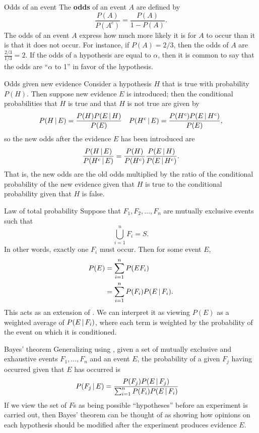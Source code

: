 \begin{bdef}{Odds of an event}\label{odds}
    The \textbf{odds} of an event $A$ are defined by \[
        \frac{P(A)}{P(A^c)} = \frac{P(A)}{1 - P(A)}.
    \] The odds of an event $A$ express how much more likely it is for $A$ to occur than it is that it does not occur. For instance, if $P(A) = 2/3$, then the odds of $A$ are $\frac{2/3}{1/3} = 2$. If the odds of a hypothesis are equal to $\alpha$, then it is common to say that the odds are ``$\alpha$ to 1'' in favor of the hypothesis.
\end{bdef}
\begin{bdef}{Odds given new evidence}\label{odds2}
    Consider a hypothesis $H$ that is true with probability $P(H)$. Then suppose new evidence $E$ is introduced; then the conditional probabilities that $H$ is true and that $H$ is not true are given by \[
        \begin{aligned}
            P(H \,\vert\, E) = \frac{P(H)P(E \,\vert\, H)}{P(E)} && P(H^c \,\vert\, E) = \frac{P(H^c)P(E \,\vert\, H^c)}{P(E)}
        \end{aligned},
    \] so the new odds after the evidence $E$ has been introduced are 
    \[
            \frac{P(H \,\vert\, E)}{P(H^c \,\vert\, E)} = \frac{P(H)}{P(H^c)}\frac{P(E \,\vert\, H)}{P(E \,\vert\, H^c)}. 
    \]
    That is, the new odds are the old odds multiplied by the ratio of the conditional probability of the new evidence given that $H$ is true to the conditional probability given that $H$ is false.
\end{bdef}
\begin{bdef}{Law of total probability}\label{totalprob}
    Suppose that $F_1, F_2, \dots, F_n$ are mutually exclusive events such that \[
        \bigcup^n_{i=1} F_i = S.    
    \] In other words, exactly one $F_i$ must occur. Then for some event $E$, \[
        \begin{aligned}
            P(E) &= \sum^n_{i=1} P(EF_i) \\
            &= \sum^n_{i=1} P(F_i)P(E \,\vert\, F_i).
        \end{aligned}    
    \] This acts as an extension of . We can interpret it as viewing $P(E)$ as a weighted average of $P(E \,\vert\, F_i)$, where each term is weighted by the probability of the event on which it is conditioned.
\end{bdef}
\begin{bdef}{Bayes' theorem}\label{genbayes}
    Generalizing  using , given a set of mutually exclusive and exhaustive events $F_1, \dots, F_n$ and an event $E$, the probability of a given $F_j$ having occurred given that $E$ has occurred is \[
        \begin{aligned}
            P(F_j \,\vert\, E) &= \frac{P(F_j)P(E \,\vert\, F_j)}{\sum^n_{i=1}P(F_i)P(E \,\vert\, F_i)}
        \end{aligned}    
    \] If we view the set of $F$s as being possible ``hypotheses'' before an experiment is carried out, then Bayes' theorem can be thought of as showing how opinions on each hypothesis should be modified after the experiment produces evidence $E$. 
\end{bdef}

